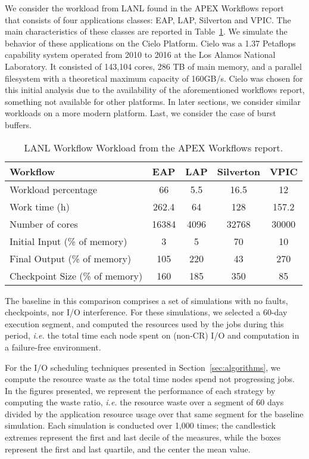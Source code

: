 \documentclass[two]{article}
\newcommand{\ie}[0]{\emph{i.e.}\xspace}
\begin{document}
We consider the workload from LANL found in the APEX Workflows
report~\cite{apex2016} that consists of four applications classes: EAP, LAP,
Silverton and VPIC. The main characteristics of these classes are reported in
Table~\ref{table:lanl}. We simulate the behavior of these applications on the
Cielo Platform. Cielo was a 1.37 Petaflops capability system operated from 2010
to 2016 at the Los Alamos National Laboratory.  It consisted of 143,104 cores,
286 TB of main memory, and a parallel filesystem with a theoretical maximum
capacity of 160GB/s.  Cielo was chosen for this initial analysis due to the
availability of the aforementioned workflows report, something not available for
other platforms. In later sections, we consider similar workloads on a more
modern platform. Last, we consider the case of burst buffers.

\begin{table}
\begin{tabular}{|l|c|c|c|c|}
\hline
 Workflow & EAP & LAP & Silverton & VPIC \\\hline
Workload percentage & 66 & 5.5 & 16.5 & 12 \\\hline
Work time (h) & 262.4 & 64 & 128 & 157.2 \\\hline
Number of cores & 16384 & 4096 & 32768 & 30000 \\\hline
Initial Input (\% of memory) &  3 & 5 & 70 & 10 \\\hline
Final Output (\% of memory) & 105 & 220 & 43 & 270 \\\hline
Checkpoint Size (\% of memory) & 160 & 185 & 350 & 85 \\\hline
\end{tabular}
\caption{LANL Workflow Workload from the APEX Workflows report.\label{table:lanl}}
\end{table}

The baseline in this comparison comprises a set of simulations with no faults,
checkpoints, nor I/O interference. For these simulations, we selected a 60-day
execution segment, and computed the resources used by the jobs during this
period, \ie the total time each node spent on (non-CR) I/O and computation in a
failure-free environment.

For the I/O scheduling techniques presented in Section~\ref{sec:algorithms}, we
compute the resource waste as the total time nodes spend not progressing jobs.
In the figures presented, we represent the performance of each strategy by
computing the waste ratio, \ie the resource waste over a segment of 60 days
divided by the application resource usage over that same segment for the
baseline simulation. Each simulation is conducted over 1,000 times; the
candlestick extremes represent the first and last decile of the measures, while
the boxes represent the first and last quartile, and the center the mean value.
\end{document}
